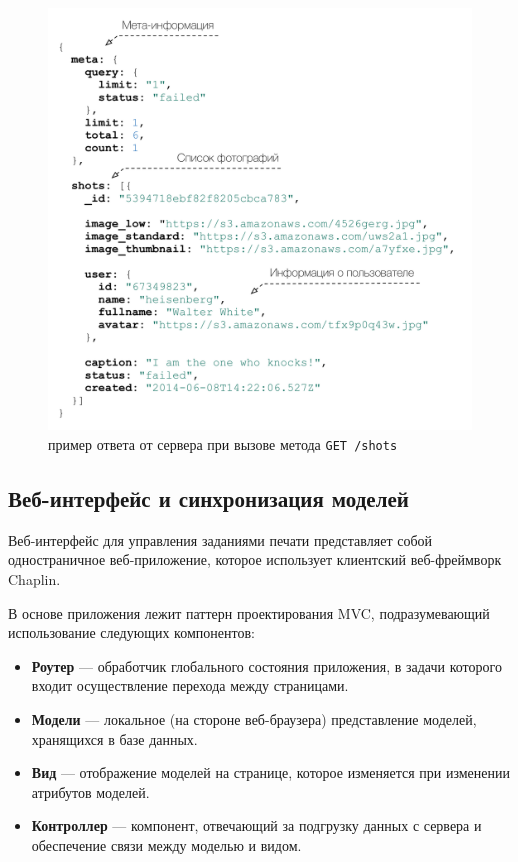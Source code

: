 \documentclass[a4paper,14pt,href,draft]{article}
\begin{document}
\begin{figure}[htbp]
\begin{center}
  \includegraphics[scale=0.7]{json-response.pdf}
    \caption{пример ответа от сервера при вызове метода \texttt{GET /shots}}
    \label{fig:JsonResponse}
\end{center}
\end{figure}


\subsection{Веб-интерфейс и синхронизация моделей}
Веб-интерфейс для управления заданиями печати представляет собой одностраничное веб-приложение, которое использует
клиентский веб-фреймворк Chaplin\cite{ChaplinJS}.

В основе приложения лежит паттерн проектирования MVC, подразумевающий использование следующих компонентов:
\begin{itemize}
  \item \textbf{Роутер} --- обработчик глобального состояния приложения, в задачи которого входит осуществление перехода между
    страницами.
  \item \textbf{Модели} --- локальное (на стороне веб-браузера) представление моделей, хранящихся в базе данных.
  \item \textbf{Вид} --- отображение моделей на странице, которое изменяется при изменении атрибутов моделей.
  \item \textbf{Контроллер} --- компонент, отвечающий за подгрузку данных с сервера и обеспечение связи между моделью и видом.
\end{itemize}
\end{document}

